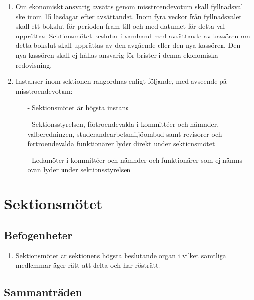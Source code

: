 \documentclass[11pt,a4paper]{article}
\begin{document}
\begin{enumerate}[\thesubsection .1]
	\item Om ekonomiskt ansvarig avsätts genom misstroendevotum skall fyllnadsval ske inom 15 läsdagar efter avsättandet. Inom fyra veckor från fyllnadsvalet skall ett bokslut för perioden fram till och med datumet för detta val upprättas. Sektionsmötet beslutar i samband med avsättande av kassören om detta bokslut skall upprättas av den avgående eller den nya kassören. Den nya kassören skall ej hållas  ansvarig för brister i denna ekonomiska redovisning. 

	\item \label{rangordning} Instanser inom sektionen rangordnas enligt följande, med avseende på misstroendevotum:


		\begin{itemize}
			\item[-] Sektionsmötet är högsta instans
			\item[-] Sektionsstyrelsen, förtroendevalda i kommittéer och nämnder, valberedningen, studerandearbetsmiljöombud samt revisorer och förtroendevalda funktionärer lyder direkt under sektionsmötet
			\item[-] Ledamöter i kommittéer och nämnder och funktionärer som ej nämns ovan lyder under sektionsstyrelsen
		\end{itemize}
	
\end{enumerate}

\newpage




\section{Sektionsmötet}

\subsection{Befogenheter}

\begin{enumerate}[\thesubsection .1]

  \item Sektionsmötet är sektionens högsta beslutande organ i vilket
  samtliga medlemmar äger rätt att delta och har rösträtt.

\end{enumerate}

\subsection{Sammanträden}
\end{document}
